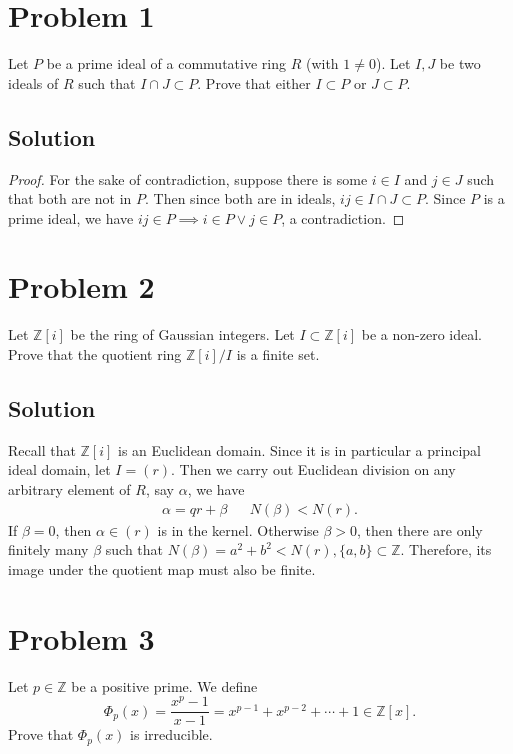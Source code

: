 \documentclass{article}
\title{\mytitle}
\author{\myname}
\date{\today}
\theoremstyle{plain}
\newcommand{\Z}{\mathbb{Z}}
\begin{document}
\maketitle
\section*{Problem 1}
Let $P$ be a prime ideal of a commutative ring $R$ (with $1\ne0$). Let $I,J$ be
two ideals of $R$ such that $I\cap J\subset P$. Prove that either $I\subset P$ or $J\subset P$.
\subsection*{Solution}
\begin{proof}
  For the sake of contradiction, suppose there is some $i\in I$ and $j\in J$ such
  that both are not in $P$. Then since both are in ideals, $ij\in I\cap J\subset P$. Since $P$
  is a prime ideal, we have $ij\in P\implies i\in P \vee j\in P$, a contradiction.
\end{proof}

\section*{Problem 2}
Let $\Z[i]$ be the ring of Gaussian integers. Let $I\subset\Z[i]$ be a non-zero ideal.
Prove that the quotient ring $\Z[i]/I$ is a finite set.
\subsection*{Solution}
Recall that $\Z[i]$ is an Euclidean domain. Since it is in particular a
principal ideal domain, let $I=(r)$. Then we carry out Euclidean division on any
arbitrary element of $R$, say $\alpha$, we have
\begin{align*}
\alpha = qr + \beta &&N(\beta)<N(r).
\end{align*}
If $\beta=0$, then $\alpha\in(r)$ is in the kernel. Otherwise $\beta>0$, then there are only
finitely many $\beta$ such that $N(\beta)=a^{2}+b^{2}<N(r), \{a,b\}\subset\Z$. Therefore, its
image under the quotient map must also be finite.

\section*{Problem 3}
Let $p\in\Z$ be a positive prime. We define
\[\Phi_{p}(x)=\frac{x^{p}-1}{x-1}=x^{p-1}+x^{p-2}+\cdots+1\in\Z[x].\]
Prove that $\Phi_{p}(x)$ is irreducible.
\end{document}
